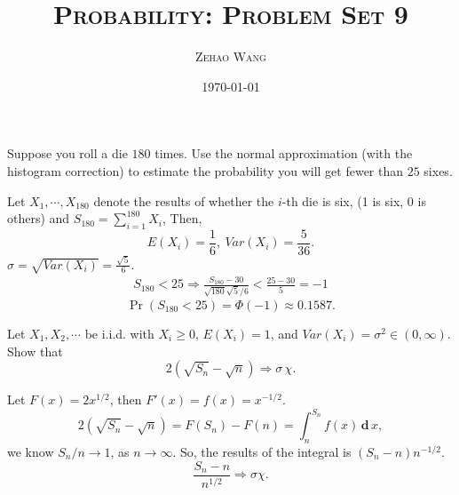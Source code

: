 \documentclass[en, normal, 12pt, black]{elegantnote}
\title{\textsc{Probability: Problem Set 9}}
\author{\textsc{Zehao Wang}}
\date{\today}
\newenvironment{exercise}[1]{\begin{tcolorbox}[colback=black!15, colframe=black!80, breakable, title=#1]}{\end{tcolorbox}}
\newenvironment{solution}{\begin{tcolorbox}[colback=white, colframe=black!50, breakable, title=Solution. ]\setlength{\parskip}{0.8em}}{\end{tcolorbox}}
\newcommand{\der}{\,\mathbf{d}\,}
\begin{document}
    \maketitle
    \begin{exercise}{3.4.1}
        Suppose you roll a die $180$ times. Use the normal approximation (with the histogram correction) to estimate the probability you will get fewer than $25$ sixes. 
    \end{exercise}
    \begin{solution}
        Let $X_1,\cdots,X_{180}$ denote the results of whether the $i$-th die is six, (1 is six, 0 is others) and $S_{180}=\sum_{i=1}^{180}X_i$, Then, 
        \[
            E(X_i)=\frac{1}{6},\ Var(X_i)=\frac{5}{36}. 
        \]
        $\sigma=\sqrt{Var(X_i)}=\frac{\sqrt{5}}{6}$. 
        \begin{align*}
            S_{180}<25\Rightarrow\frac{S_{180}-30}{\sqrt{180}\sqrt{5}/6}<\frac{25-30}{5}=-1
        \end{align*}
        \[\Pr(S_{180}<25)=\Phi(-1)\approx0.1587.\]
    \end{solution}


    \begin{exercise}{3.4.4}
        Let $X_1, X_2, \cdots$ be i.i.d. with $X_i \geqslant 0$, $E(X_i) = 1$, and $Var(X_i)= \sigma^2\in(0,\infty)$. Show that 
        \[
            2\left(\sqrt{S_n}-\sqrt{n}\right)\Rightarrow\sigma\,\chi. 
        \]
    \end{exercise}

    \begin{solution}
        Let $F(x)=2x^{1/2}$, then $F'(x)=f(x)=x^{-1/2}$. 
        \[
            2\left(\sqrt{S_n}-\sqrt{n}\right)=F(S_n)-F(n)=\int_n^{S_n}f(x)\der x, 
        \]
        we know $S_n/n\to1$, as $n\to\infty$. So, the results of the integral is $(S_n-n)n^{-1/2}$. 
        \[
            \frac{S_n-n}{n^{1/2}}\Rightarrow\sigma\chi. 
        \]
    \end{solution}
\end{document}
